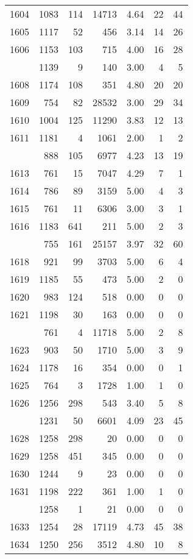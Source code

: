 \documentclass[
]{article}
\begin{document}
\begin{table}
\begin{tabular}[t]{lrrrrrr}
1604 & 1083 & 114 & 14713 & 4.64 & 22 & 44\\
1605 & 1117 & 52 & 456 & 3.14 & 14 & 26\\
1606 & 1153 & 103 & 715 & 4.00 & 16 & 28\\
\addlinespace
1607 & 1139 & 9 & 140 & 3.00 & 4 & 5\\
1608 & 1174 & 108 & 351 & 4.80 & 20 & 20\\
1609 & 754 & 82 & 28532 & 3.00 & 29 & 34\\
1610 & 1004 & 125 & 11290 & 3.83 & 12 & 13\\
1611 & 1181 & 4 & 1061 & 2.00 & 1 & 2\\
\addlinespace
1612 & 888 & 105 & 6977 & 4.23 & 13 & 19\\
1613 & 761 & 15 & 7047 & 4.29 & 7 & 1\\
1614 & 786 & 89 & 3159 & 5.00 & 4 & 3\\
1615 & 761 & 11 & 6306 & 3.00 & 3 & 1\\
1616 & 1183 & 641 & 211 & 5.00 & 2 & 3\\
\addlinespace
1617 & 755 & 161 & 25157 & 3.97 & 32 & 60\\
1618 & 921 & 99 & 3703 & 5.00 & 6 & 4\\
1619 & 1185 & 55 & 473 & 5.00 & 2 & 0\\
1620 & 983 & 124 & 518 & 0.00 & 0 & 0\\
1621 & 1198 & 30 & 163 & 0.00 & 0 & 0\\
\addlinespace
1622 & 761 & 4 & 11718 & 5.00 & 2 & 8\\
1623 & 903 & 50 & 1710 & 5.00 & 3 & 9\\
1624 & 1178 & 16 & 354 & 0.00 & 0 & 1\\
1625 & 764 & 3 & 1728 & 1.00 & 1 & 0\\
1626 & 1256 & 298 & 543 & 3.40 & 5 & 8\\
\addlinespace
1627 & 1231 & 50 & 6601 & 4.09 & 23 & 45\\
1628 & 1258 & 298 & 20 & 0.00 & 0 & 0\\
1629 & 1258 & 451 & 345 & 0.00 & 0 & 0\\
1630 & 1244 & 9 & 23 & 0.00 & 0 & 0\\
1631 & 1198 & 222 & 361 & 1.00 & 1 & 0\\
\addlinespace
1632 & 1258 & 1 & 21 & 0.00 & 0 & 0\\
1633 & 1254 & 28 & 17119 & 4.73 & 45 & 38\\
1634 & 1250 & 256 & 3512 & 4.80 & 10 & 8\\

\end{tabular}
\end{table}
\end{document}
